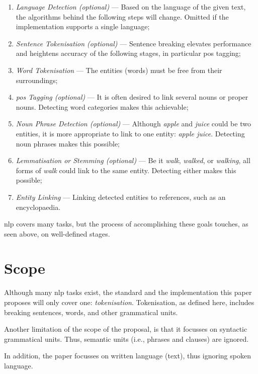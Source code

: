 \begin{enumerate}
\item\emph{Language Detection (optional)} --- Based on the language of the
    given text, the algorithms behind the following steps will change.
  Omitted if the implementation supports a single language;
\item\emph{Sentence Tokenisation (optional)} --- Sentence breaking elevates
    performance and heightens accuracy of the following stages, in
    particular \acrshort{pos} tagging;
\item\emph{Word Tokenisation} --- The entities (words) must be free from
  their surroundings;
\item\emph{\acrfull{pos} Tagging (optional)} --- It is often desired to link
    several nouns or proper nouns.
  Detecting word categories makes this achievable;
\item\emph{Noun Phrase Detection (optional)} --- Although \emph{apple} and
    \emph{juice} could be two entities, it is more appropriate to link to
    one entity: \emph{apple juice}.
  Detecting noun phrases makes this possible;
\item\emph{Lemmatisation or Stemming (optional)} --- Be it \emph{walk},
    \emph{walked}, or \emph{walking}, all forms of \emph{walk} could link
    to the same entity.
  Detecting either makes this possible;
\item\emph{Entity Linking} --- Linking detected entities to references, such
    as an encyclopaedia.
\end{enumerate}

\noindent \gls{nlp} covers many tasks, but the process of accomplishing these
  goals touches, as seen above, on well-defined stages.

\section{Scope}\label{scope}

Although many \gls{nlp} tasks exist, the standard and the implementation
  this paper proposes will only cover one: \emph{tokenisation}.
Tokenisation, as defined here, includes breaking sentences, words, and
other grammatical units.

Another limitation of the scope of the proposal, is that it focusses on
  syntactic grammatical units. Thus, semantic units (i.e., phrases and
  clauses) are ignored.

In addition, the paper focusses on written language (text), thus ignoring
  spoken language.

